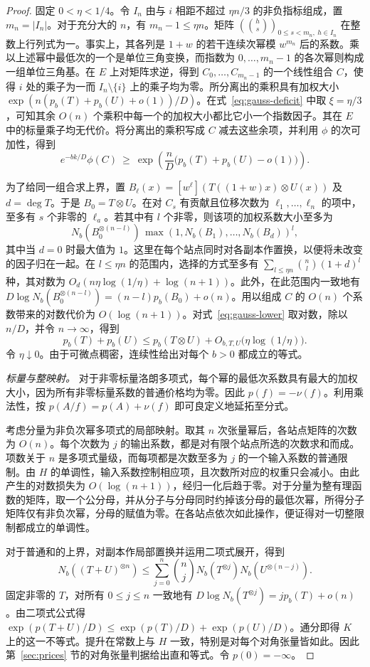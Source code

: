 \begin{proof}
固定 $0<\eta<1/4$。令 $I_n$ 由与 $i$ 相距不超过 $\eta n/3$ 的非负指标组成，置 $m_n=|I_n|$。对于充分大的 $n$，有 $m_n-1\le\eta n$。矩阵 $(\binom hs)_{0\le s<m_n,\ h\in I_n}$ 在整数上行列式为一。事实上，其各列是 $1+w$ 的若干连续次幂模 $w^{m_n}$ 后的系数。乘以上述幂中最低次的一个是单位三角变换，而指数为 $0,\ldots,m_n-1$ 的各次幂则构成一组单位三角基。在 $E$ 上对矩阵求逆，得到 $C_0,\ldots,C_{m_n-1}$ 的一个线性组合 $C$，使得 $i$ 处的乘子为一而 $I_n\setminus\{i\}$ 上的乘子均为零。所分离出的乘积具有加权大小 $\exp(n(p_b(T)+p_b(U)+o(1))/D)$。在式~\eqref{eq:gauss-deficit} 中取 $\xi=\eta/3$，可知其余 $O(n)$ 个乘积中每一个的加权大小都比它小一个指数因子。其在 $E$ 中的标量乘子均无代价。将分离出的乘积写成 $C$ 减去这些余项，并利用 $\phi$ 的次可加性，得到
\begin{equation}\label{eq:gauss-lower}
 e^{-bk/D}\phi(C)\ \ge\
 \exp\!\left(\frac nD\bigl(p_b(T)+p_b(U)-o(1)\bigr)\right).
\end{equation}

为了给同一组合求上界，置 $B_\ell(x)=[w^\ell](T((1+w)x)\otimes U(x))$ 及 $d=\deg T$。于是 $B_0=T\otimes U$。在对 $C_s$ 有贡献且位移次数为 $\ell_1,\ldots,\ell_n$ 的项中，至多有 $s$ 个非零的 $\ell_a$。若其中有 $l$ 个非零，则该项的加权系数大小至多为
\[
 N_b(B_0^{\otimes(n-l)})\,\max(1,N_b(B_1),\ldots,N_b(B_d))^l,
\]
其中当 $d=0$ 时最大值为 $1$。这里在每个站点同时对各副本作置换，以便将未改变的因子归在一起。在 $l\le\eta n$ 的范围内，选择的方式至多有 $\sum_{l\le\eta n}\binom nl(1+d)^l$ 种，其对数为 $O_d(n\eta\log(1/\eta)+\log(n+1))$。此外，在此范围内一致地有 $D\log N_b(B_0^{\otimes(n-l)})=(n-l)p_b(B_0)+o(n)$。用以组成 $C$ 的 $O(n)$ 个系数带来的对数代价为 $O(\log(n+1))$。对式~\eqref{eq:gauss-lower} 取对数，除以 $n/D$，并令 $n\to\infty$，得到
\[
 p_b(T)+p_b(U)\le p_b(T\otimes U)+O_{b,T,U}\bigl(\eta\log(1/\eta)\bigr).
\]
令 $\eta\downarrow0$。由于可微点稠密，连续性给出对每个 $b>0$ 都成立的等式。

\smallskip\noindent\emph{标量与整映射。}
对于非零标量洛朗多项式，每个幂的最低次系数具有最大的加权大小，因为所有非零标量系数的普通价格均为零。因此 $p(f)=-\nu(f)$。利用乘法性，按 $p(A/f)=p(A)+\nu(f)$ 即可良定义地延拓至分式。

考虑分量为非负次幂多项式的局部映射。取其 $n$ 次张量幂后，各站点矩阵的次数为 $O(n)$。每个次数为 $j$ 的输出系数，都是对有限个站点所选的次数求和而成。项数关于 $n$ 是多项式量级，而每项都是次数至多为 $j$ 的一个输入系数的普通限制。由 $H$ 的单调性，输入系数控制相应项，且次数所对应的权重只会减小。由此产生的对数损失为 $O(\log(n+1))$，经归一化后趋于零。对于分量为整有理函数的矩阵，取一个公分母，并从分子与分母同时约掉该分母的最低次幂，所得分子矩阵仅有非负次幂，分母的赋值为零。在各站点依次如此操作，便证得对一切整限制都成立的单调性。

对于普通和的上界，对副本作局部置换并运用二项式展开，得到
\[
 N_b((T+U)^{\otimes n})\le\sum_{j=0}^n\binom nj
        N_b(T^{\otimes j})N_b(U^{\otimes(n-j)}).
\]
固定非零的 $T$，对所有 $0\le j\le n$ 一致地有 $D\log N_b(T^{\otimes j})=jp_b(T)+o(n)$。由二项式公式得 $\exp(p(T+U)/D)\le\exp(p(T)/D)+\exp(p(U)/D)$。通分即得 $K$ 上的这一不等式。提升在常数上与 $H$ 一致，特别是对每个对角张量皆如此。因此第~\ref{sec:prices} 节的对角张量判据给出直和等式。令 $p(0)=-\infty$。
\end{proof}

